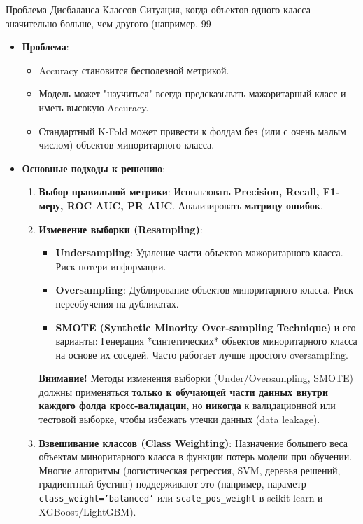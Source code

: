 \begin{textbox}{Проблема Дисбаланса Классов}
    Ситуация, когда объектов одного класса значительно больше, чем другого (например, 99%
    \begin{itemize}
        \item \textbf{Проблема}:
            \begin{itemize}
                \item Accuracy становится бесполезной метрикой.
                \item Модель может "научиться" всегда предсказывать мажоритарный класс и иметь высокую Accuracy.
                \item Стандартный K-Fold может привести к фолдам без (или с очень малым числом) объектов миноритарного класса.
            \end{itemize}
        \item \textbf{Основные подходы к решению}:
            \begin{enumerate}
                \item \textbf{Выбор правильной метрики}: Использовать \textbf{Precision, Recall, F1-меру, ROC AUC, PR AUC}. Анализировать \textbf{матрицу ошибок}.
                \item \textbf{Изменение выборки (Resampling)}:
                    \begin{itemize}
                        \item \textbf{Undersampling}: Удаление части объектов мажоритарного класса. Риск потери информации.
                        \item \textbf{Oversampling}: Дублирование объектов миноритарного класса. Риск переобучения на дубликатах.
                        \item \textbf{SMOTE (Synthetic Minority Over-sampling Technique)} и его варианты: Генерация *синтетических* объектов миноритарного класса на основе их соседей. Часто работает лучше простого oversampling.
                    \end{itemize}
                    \textbf{Внимание!} Методы изменения выборки (Under/Oversampling, SMOTE) должны применяться \textbf{только к обучающей части данных внутри каждого фолда кросс-валидации}, но \textbf{никогда} к валидационной или тестовой выборке, чтобы избежать утечки данных (data leakage). %
                \item \textbf{Взвешивание классов (Class Weighting)}: Назначение большего веса объектам миноритарного класса в функции потерь модели при обучении. Многие алгоритмы (логистическая регрессия, SVM, деревья решений, градиентный бустинг) поддерживают это (например, параметр \texttt{class\_weight='balanced'} или \texttt{scale\_pos\_weight} в scikit-learn и XGBoost/LightGBM).

\end{enumerate}
\end{itemize}
\end{textbox}
